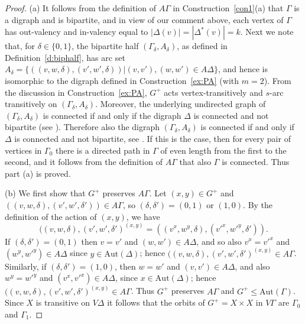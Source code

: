 \documentclass[11pt]{amsart}
\newcommand{\Aut}{\mathrm{Aut}}
\begin{document}
\begin{proof}
(a)  It follows from the definition of $A
\Gamma$ in Construction~\ref{con1}(a) that $\Gamma$ is a digraph and is bipartite, and in view of our comment above, each vertex of $\Gamma$ has  out-valency and in-valency equal to $|\Delta(v)|=|\Delta^*(v)|=k$. Next we note that, for $\delta\in\{0,1\}$,  the bipartite half $(\Gamma_\delta,A_\delta)$, as defined in Definition~\ref{d:biphalf}, has arc set $A_\delta=\{((v,w,\delta), (v',w',\delta))| (v,v'), (w,w')\in A\Delta\}$, and hence is isomorphic to the digraph defined in Construction~\ref{ex:PA} (with $m=2$). From the discussion in Construction~\ref{ex:PA}, $G^+$ acts vertex-transitively and $s$-arc transitively on $(\Gamma_\delta,A_\delta)$. Moreover, the underlying undirected graph of $(\Gamma_\delta,A_\delta)$ is connected if and only if the digraph $\Delta$ is connected and not bipartite (see \cite[Section 6.3]{GR}). Therefore also the digraph $(\Gamma_\delta,A_\delta)$ is connected if and only if $\Delta$ is connected and not bipartite, see \cite[Theorem 1.10]{Cameron}. If this is the case, then for every pair of vertices in $\Gamma_0$ there is a directed path in $\Gamma$ of even length from the first to the second, and it follows from the definition of $A\Gamma$ that also $\Gamma$ is connected.   Thus part (a) is proved. 




\smallskip
(b)     We first show that \(G^+\) preserves \(A\Gamma\). Let \((x,y)\in G^+\) and \(((v,w,\delta),(v',w',\delta'))\in A\Gamma\), so $(\delta,\delta')=(0,1)$ or $(1,0)$.  By the definition of the action of $(x,y)$, we have
    \[
    ((v,w,\delta),(v',w',\delta')^{(x,y)} = 
        ((v^x,w^y,\delta),(v'^x,w'^y,\delta')).   
    \]
   If $(\delta,\delta')=(0,1)$  then \(v=v'\) and \((w,w')\in A\Delta\), and so also  \(v^x=v'^x\) and \((w^y,w'^y)\in A\Delta\) since $y\in\Aut(\Delta)$; hence $((v,w,\delta),(v',w',\delta')^{(x,y)}\in A\Gamma$. Similarly, if $(\delta,\delta')=(1,0)$, then  \(w=w'\) and \((v,v')\in A\Delta\), and also  \(w^y=w'^y\) and \((v^x,v'^x)\in A\Delta\), since $x\in\Aut(\Delta)$; hence $((v,w,\delta),(v',w',\delta')^{(x,y)}\in A\Gamma$.  Thus \(G^+\) preserves \(A\Gamma\) and \(G^+\leqslant \Aut(\Gamma)\). 
    Since $X$ is transitive on $V\Delta$ it follows that the orbits of $G^+=X\times X$ in $V\Gamma$ are $\Gamma_0$ and $\Gamma_1$. 



\end{proof}
\end{document}
